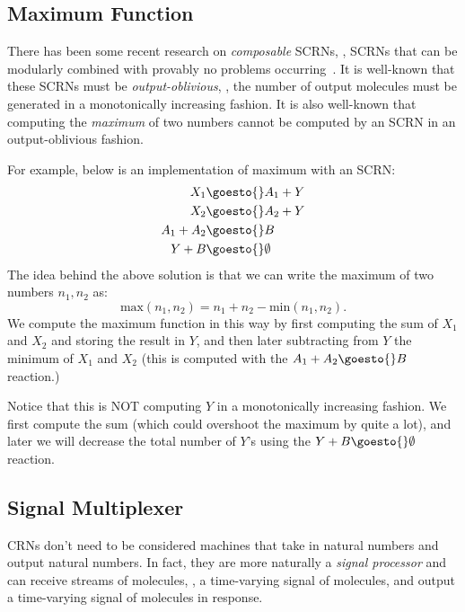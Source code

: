 \subsection{Maximum Function}
There has been some recent research on \emph{composable} SCRNs, \ie, SCRNs that can be modularly combined with provably no problems occurring~\cite{doty19}.
It is well-known that these SCRNs must be \emph{output-oblivious}, \ie, the number of output molecules must be generated in a monotonically increasing fashion.
It is also well-known that computing the \emph{maximum} of two numbers cannot be computed by an SCRN in an output-oblivious fashion.

For example, below is an implementation of maximum with an SCRN:
\begin{align}
    X_1 &\goesto{} A_1 + Y\\
    X_2 &\goesto{} A_2 + Y\\
    A_1 + A_2 &\goesto{} B\\
    Y + B &\goesto{} \emptyset
\end{align}
The idea behind the above solution is that we can write the maximum of two numbers \( n_1, n_2 \) as:
\[
    \text{max}(n_1, n_2) = n_1 + n_2 - \text{min}(n_1, n_2).
\]
We compute the maximum function in this way by first computing the sum of \( X_1 \) and \( X_2 \) and storing the result in \( Y \), and then later subtracting from \( Y \) the minimum of \( X_1 \) and \( X_2 \) (this is computed with the \( A_1 + A_2 \goesto{} B \) reaction.)

Notice that this is NOT computing \( Y \) in a monotonically increasing fashion.
We first compute the sum (which could overshoot the maximum by quite a lot), and later we will decrease the total number of \( Y \)'s using the \( Y + B \goesto{} \emptyset \) reaction.

\subsection{Signal Multiplexer}
CRNs don't need to be considered machines that take in natural numbers and output natural numbers.
In fact, they are more naturally a \emph{signal processor} and can receive streams of molecules, \ie, a time-varying signal of molecules, and output a time-varying signal of molecules in response.

